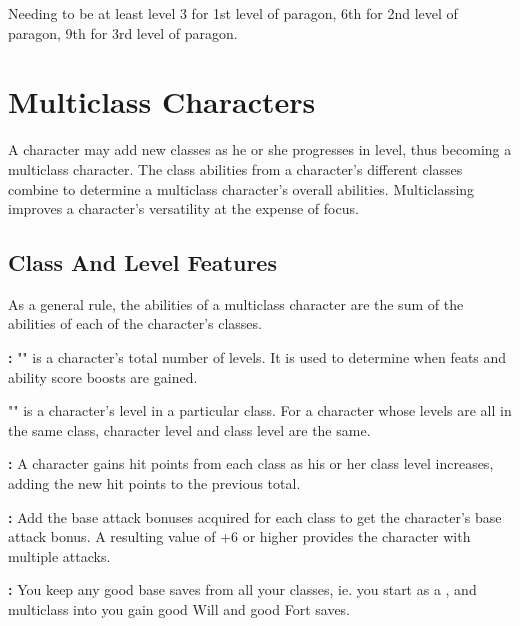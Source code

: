 Needing to be at least level 3 for 1st level of paragon, 6th for 2nd level of paragon, 9th for 3rd level of paragon.


\pagebreak

\pagebreak

\pagebreak

\pagebreak

\pagebreak

\section{Multiclass Characters}

A character may add new classes as he or she progresses in level, thus becoming 
a multiclass character. The class abilities from a character's different classes 
combine to determine a multiclass character's overall abilities. Multiclassing 
improves a character's versatility at the expense of focus.



\subsection{Class And Level Features}

As a general rule, the abilities of a multiclass character are the sum of the abilities 
of each of the character's classes.

\textbf{:} "" is a character's total number of levels. It is used to determine when feats and ability score boosts are gained.

"" is a character's level in a particular class. For a character whose levels are all in the same class, character level and class level are the same.

\textbf{:} A character gains hit points from each class as his or her class level increases, adding the new hit points to the previous total. 

\textbf{:} Add the base attack bonuses acquired for each class to get the character's base attack bonus. A resulting value of +6 or higher provides the character with multiple attacks. 

\textbf{:} You keep any good base saves from all your classes, ie. you start as a , and multiclass into  you gain good Will and good Fort saves.

